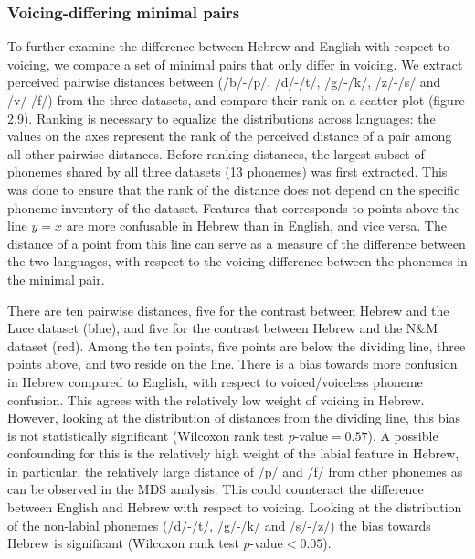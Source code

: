 \subsubsection{Voicing-differing minimal pairs} To further examine the difference between Hebrew and English with respect to voicing, we compare a set of minimal pairs that only differ in voicing. We extract perceived pairwise distances between (/b/-/p/, /d/-/t/, /g/-/k/, /z/-/s/ and /v/-/f/) from the three datasets, and compare their rank on a scatter plot (figure 2.9). Ranking is necessary to equalize the distributions across languages: the values on the axes represent the rank of the perceived distance of a pair among all other pairwise distances. Before ranking distances, the largest subset of phonemes shared by all three datasets (13 phonemes) was first extracted. This was done to ensure that the rank of the distance does not depend on the specific phoneme inventory of the dataset. Features that corresponds to points above the line $y=x$ are more confusable in Hebrew than in English, and vice versa. The distance of a point from this line can serve as a measure of the difference between the two languages, with respect to the voicing difference between the phonemes in the minimal pair.

There are ten pairwise distances, five for the contrast between Hebrew and the Luce dataset (blue), and five for the contrast between Hebrew and the N\&M dataset (red). Among the ten points, five points are below the dividing line, three points above, and two reside on the line. There is a bias towards more confusion in Hebrew compared to English, with respect to voiced/voiceless phoneme confusion. This agrees with the relatively low weight of voicing in Hebrew. However, looking at the distribution of distances from the dividing line, this bias is not statistically significant (Wilcoxon rank test $p$-value$=0.57$). A possible confounding for this is the relatively high weight of the labial feature in Hebrew, in particular, the relatively large distance of /p/ and /f/ from other phonemes as can be observed in the MDS analysis. This could counteract the difference between English and Hebrew with respect to voicing. Looking at the distribution of the non-labial phonemes (/d/-/t/, /g/-/k/ and /s/-/z/) the bias towards Hebrew is significant (Wilcoxon rank test $p$-value$<0.05$).

